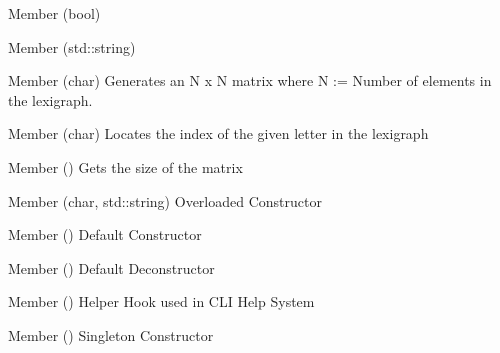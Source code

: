 \begin{DoxyRefList}
\item[Member \doxylink{classx_ciphers_a1a762689d6c91e06d935ce577dd39f86}{x\+Ciphers\+::display\+Matrix} (bool)]\label{todo__todo000067}%
%
~\newline
  
\item[Member \doxylink{classx_ciphers_afc5d4868225cb94707706f21bca970d9}{x\+Ciphers\+::encode} (std\+::string)]\label{todo__todo000065}%
%
~\newline
  
\item[Member \doxylink{classx_ciphers_adec10429127b58b5980d76f5364f7470}{x\+Ciphers\+::generate\+Matrix} (char)]\label{todo__todo000063}%
%
Generates an N x N matrix where N \+:= Number of elements in the lexigraph.  
\item[Member \doxylink{classx_ciphers_a6262463a0e235edc15f9e9669ce1acfe}{x\+Ciphers\+::get\+Index} (char)]\label{todo__todo000062}%
%
Locates the index of the given letter in the lexigraph  
\item[Member \doxylink{classx_ciphers_aeaf0cc6df8f4311e7d78bf20fa43367c}{x\+Ciphers\+::get\+Matrix\+Size} ()]\label{todo__todo000064}%
%
Gets the size of the matrix  
\item[Member \doxylink{classx_ciphers_a00a0f817604750bb2695f2e23143cf51}{x\+Ciphers\+::x\+Ciphers} (char, std\+::string)]\label{todo__todo000061}%
%
Overloaded Constructor  
\item[Member \doxylink{classx_ciphers_ac3cb3f87a08a7cfb39395ef2bf31aad6}{x\+Ciphers\+::x\+Ciphers} ()]\label{todo__todo000060}%
%
Default Constructor  
\item[Member \doxylink{classx_ciphers_a38ade0d7701361e1132711d1c25b4d00}{x\+Ciphers\+::\texorpdfstring{$\sim$}{\string~}x\+Ciphers} ()]\label{todo__todo000068}%
%
Default Deconstructor  
\item[Member \doxylink{classx_clock_a4d86925f4754c28273d109c96445fd88}{x\+Clock\+::\+\_\+help} ()]\label{todo__todo000073}%
%
Helper Hook used in CLI Help System  
\item[Member \doxylink{classx_clock_a3b6d8cf061eb54a9f98914825cb54936}{x\+Clock\+::do\+Cycle\+Work} ()]\label{todo__todo000072}%
%
Singleton Constructor 


\end{DoxyRefList}
